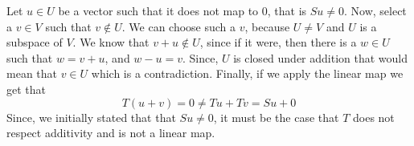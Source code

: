 \documentclass[10pt, twocolumn]{article}
\begin{document}
\begin{q}[10]
	Let $ u \in U $ be a vector such that it does not map to 0, that is $ Su \neq 0 $. 
	Now, select a $ v \in V $ such that $ v \not\in U $. 
	We can choose such a $ v $, because $ U \neq V $ and $ U $ is a subspace of $ V $. 
	We know that $ v + u \not\in U $, since if it were, then there is a $ w \in U $ such that $ w = v + u $, 
	and $ w - u = v $. 
	Since, $ U $ is closed under addition that would mean that $ v \in U $ which is a contradiction. 
	Finally, if we apply the linear map we get that 
	$$ T(u + v)	 = 0 \neq Tu + Tv = Su + 0 $$
	Since, we initially stated that that $ Su \neq 0 $, it must be the case that $ T $ does not respect additivity and is not a linear map. 
\end{q}
\end{document}
